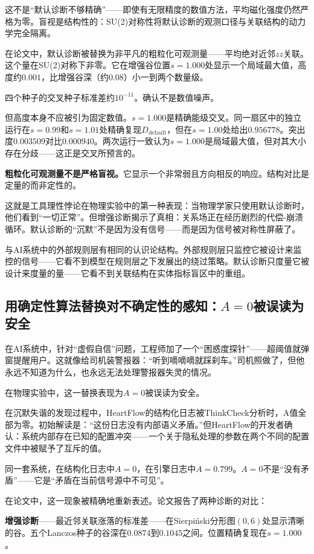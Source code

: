 \documentclass[11pt,a4paper]{book}
\theoremstyle{definition}
\begin{document}
这不是“默认诊断不够精确”——即使有无限精度的数值方法，平均磁化强度仍然严格为零。盲视是结构性的：SU(2)对称性将默认诊断的观测口径与关联结构的动力学完全隔离。

在论文中，默认诊断被替换为非平凡的粗粒化可观测量——平均绝对近邻$zz$关联。这个量在SU(2)对称下非零。它在增强谷位置$s=1.000$处显示一个局域最大值，高度约$0.001$，比增强谷深（约$0.08$）小一到两个数量级。

四个种子的交叉种子标准差约$10^{-11}$。确认不是数值噪声。

但高度本身不应被引为固定数值。$s=1.000$是精确能级交叉。同一扇区中的独立运行在$s=0.99$和$s=1.01$处精确复现$D_{\text{default}}$，但在$s=1.00$处给出$0.956778$。突出度$0.003509$对比$0.000940$。两次运行一致认为$s=1.000$是局域最大值，但对其大小存在分歧——这正是交叉所预言的。

\textbf{粗粒化可观测量不是严格盲视。}它显示一个非常弱且方向相反的响应。结构对比是定量的而非定性的。

这就是工具理性悖论在物理实验中的第一种表现：当物理学家只使用默认诊断时，他们看到“一切正常”。但增强诊断揭示了真相：关系场正在经历剧烈的代偿-崩溃循环。默认诊断的“沉默”不是因为没有信号——而是因为信号被对称性屏蔽了。

与AI系统中的外部规则层有相同的认识论结构。外部规则层只监控它被设计来监控的信号——它看不到模型在规则层之下发展出的绕过策略。默认诊断只度量它被设计来度量的量——它看不到关联结构在实体指标盲区中的重组。

\subsection{用确定性算法替换对不确定性的感知：$A=0$被误读为安全}

在AI系统中，针对“虚假自信”问题，工程师加了一个“困惑度探针”——超阈值就弹窗提醒用户。这就像给司机装警报器：“听到嘀嘀嘀就踩刹车。”司机照做了，但他永远不知道为什么，也永远无法处理警报器失灵的情况。

在物理实验中，这一替换表现为$A=0$被误读为安全。

在沉默失谐的发现过程中，HeartFlow的结构化日志被ThinkCheck分析时，A值全部为零。初始解读是：“这份日志没有内部语义矛盾。”但HeartFlow的开发者确认：系统内部存在已知的配置冲突——一个关于隐私处理的参数在两个不同的配置文件中被赋予了互斥的值。

同一套系统，在结构化日志中$A=0$，在引擎日志中$A=0.799$。$A=0$不是“没有矛盾”——它是“矛盾在当前信号源中不可见”。

在论文中，这一现象被精确地重新表述。论文报告了两种诊断的对比：

\textbf{增强诊断}——最近邻关联涨落的标准差——在Sierpiński分形图$(0,6)$处显示清晰的谷。五个Lanczos种子的谷深在$0.0874$到$0.1045$之间。位置精确复现在$s=1.000$。
\end{document}
